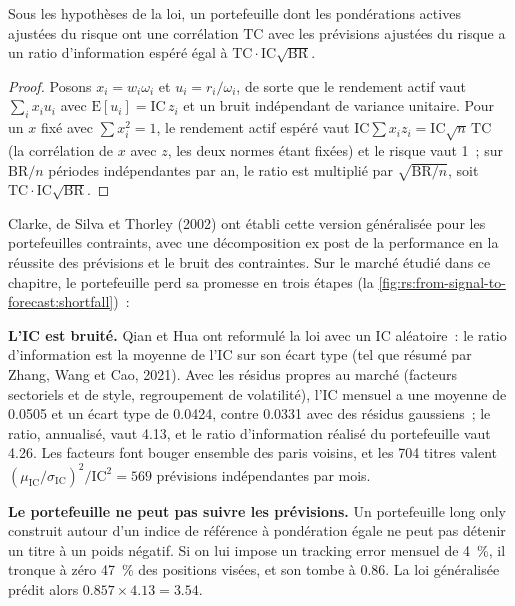 \begin{proposition}\label{prop:rs:from-signal-to-forecast:generalised}
Sous les hypothèses de la loi, un portefeuille dont les pondérations actives ajustées du risque ont une corrélation $\mathrm{TC}$ avec les prévisions ajustées du risque
a un ratio d'information espéré égal à $\mathrm{TC}\cdot\mathrm{IC}\sqrt{\mathrm{BR}}$.
\end{proposition}

\begin{proof}
Posons $x_i = w_i\omega_i$ et $u_i = r_i/\omega_i$, de sorte que le rendement actif vaut $\sum_i x_iu_i$ avec $\mathrm{E}[u_i] = \mathrm{IC}\,z_i$ et un bruit indépendant
de variance unitaire. Pour un $x$ fixé avec $\sum x_i^2 = 1$, le rendement actif espéré vaut $\mathrm{IC}\sum x_iz_i = \mathrm{IC}\sqrt n\,\mathrm{TC}$ (la
corrélation de $x$ avec $z$, les deux normes étant fixées) et le risque vaut 1~; sur $\mathrm{BR}/n$ périodes indépendantes par an, le ratio est multiplié par
$\sqrt{\mathrm{BR}/n}$, soit $\mathrm{TC}\cdot\mathrm{IC}\sqrt{\mathrm{BR}}$.
\end{proof}

Clarke, de Silva et Thorley (2002) ont établi cette version généralisée pour les portefeuilles contraints, avec une décomposition ex post de la performance en
la réussite des prévisions et le bruit des contraintes. Sur le marché étudié dans ce chapitre, le portefeuille perd sa promesse en trois étapes
(la \cref{fig:rs:from-signal-to-forecast:shortfall})~:

\textbf{L'IC est bruité.} Qian et Hua ont reformulé la loi avec un IC aléatoire~: le ratio d'information est la moyenne de l'IC sur son écart
type (tel que résumé par Zhang, Wang et Cao, 2021). Avec les résidus propres au marché (facteurs sectoriels et de style, regroupement de
volatilité), l'IC mensuel a une moyenne de 0.0505 et un écart type de 0.0424, contre 0.0331 avec des résidus gaussiens~; le ratio, annualisé, vaut 4.13, et le
ratio d'information réalisé du portefeuille vaut 4.26. Les facteurs font bouger ensemble des paris voisins, et les 704 titres valent
$(\mu_{\mathrm{IC}}/\sigma_{\mathrm{IC}})^2/\mathrm{IC}^2 = 569$ prévisions indépendantes par mois.

\textbf{Le portefeuille ne peut pas suivre les prévisions.} Un portefeuille long only construit autour d'un indice de référence à pondération égale ne peut pas détenir un titre à un poids négatif. Si on lui impose un
tracking error mensuel de 4~\%, il tronque à zéro 47~\% des positions visées, et son  tombe à 0.86. La loi généralisée
prédit alors $0.857 \times 4.13 = 3.54$.

